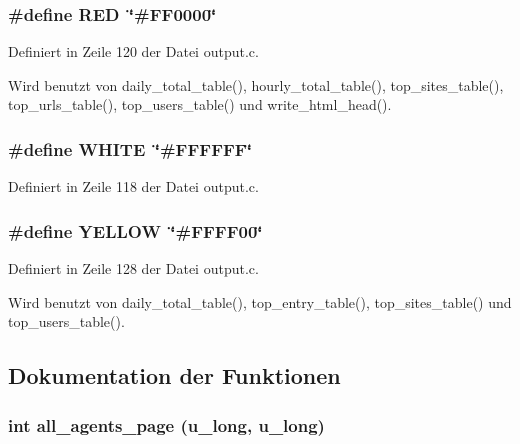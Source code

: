 \subsubsection{\setlength{\rightskip}{0pt plus 5cm}\#define RED~\char`\"{}\#FF0000\char`\"{}}\label{output_8c_8d23feea868a983c8c2b661e1e16972f}




Definiert in Zeile 120 der Datei output.c.

Wird benutzt von daily\_\-total\_\-table(), hourly\_\-total\_\-table(), top\_\-sites\_\-table(), top\_\-urls\_\-table(), top\_\-users\_\-table() und write\_\-html\_\-head().
\subsubsection{\setlength{\rightskip}{0pt plus 5cm}\#define WHITE~\char`\"{}\#FFFFFF\char`\"{}}\label{output_8c_87b537f5fa5c109d3c05c13d6b18f382}




Definiert in Zeile 118 der Datei output.c.
\subsubsection{\setlength{\rightskip}{0pt plus 5cm}\#define YELLOW~\char`\"{}\#FFFF00\char`\"{}}\label{output_8c_bf681265909adf3d3e8116c93c0ba179}




Definiert in Zeile 128 der Datei output.c.

Wird benutzt von daily\_\-total\_\-table(), top\_\-entry\_\-table(), top\_\-sites\_\-table() und top\_\-users\_\-table().

\subsection{Dokumentation der Funktionen}
\subsubsection{\setlength{\rightskip}{0pt plus 5cm}int all\_\-agents\_\-page (u\_\-long, u\_\-long)}\label{output_8c_4f27932d464425450d0c11106ae0c2fe}




